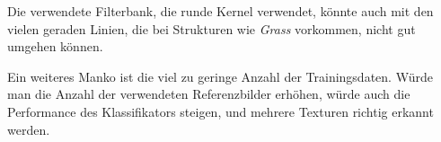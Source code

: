 Die verwendete Filterbank, die runde Kernel verwendet, könnte auch mit den vielen geraden Linien, die bei Strukturen wie \emph{Grass} vorkommen, nicht gut umgehen können.

Ein weiteres Manko ist die viel zu geringe Anzahl der Trainingsdaten. Würde man die Anzahl der verwendeten Referenzbilder erhöhen, würde auch die Performance des Klassifikators steigen, und mehrere Texturen richtig erkannt werden.


%
%

\FloatBarrier\label{end-of-document}


